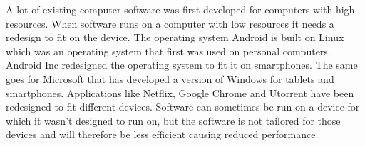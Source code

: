 A lot of existing computer software was first developed for computers with high resources. When software runs on a computer with low resources it needs a redesign to fit on the device. The operating system Android is built on Linux which was an operating system that first was used on personal computers. Android Inc redesigned the operating system to fit it on smartphones. The same goes for Microsoft that has developed a version of Windows for tablets and smartphones. Applications like Netflix, Google Chrome and Utorrent have been redesigned to fit different devices. Software can sometimes be run on a device for which it wasn't designed to run on, but the software is not tailored for those devices and will therefore be less efficient causing reduced performance.

